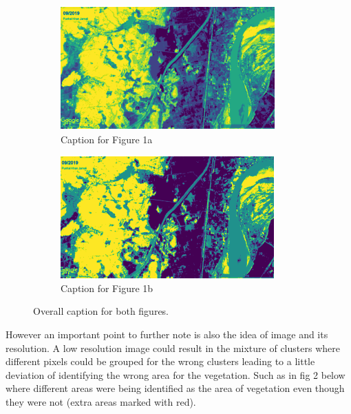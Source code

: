 \documentclass[12pt,a4paper,IEEEtran]{article}
\begin{document}
\begin{figure}[ht]
    \centering
    \begin{subfigure}{0.45\textwidth}
        \includegraphics[width=\linewidth]{fig1a.PNG} %
        \caption{Caption for Figure 1a}
        \label{fig:subfig1}
    \end{subfigure}
    \hfill
    \begin{subfigure}{0.45\textwidth}
        \includegraphics[width=\linewidth]{fig1b.PNG} %
        \caption{Caption for Figure 1b}
        \label{fig:subfig2}
    \end{subfigure}
    \caption{Overall caption for both figures.}
    \label{fig:overall}
\end{figure}

However an important point to further note is also the idea of image and its resolution. A low resolution image could result in the mixture of clusters where different pixels could be grouped for the wrong clusters leading to a little deviation of identifying the wrong area for the vegetation. Such as in fig 2 below where different areas were being identified as the area of vegetation even though they were not (extra areas marked with red). 
\end{document}

